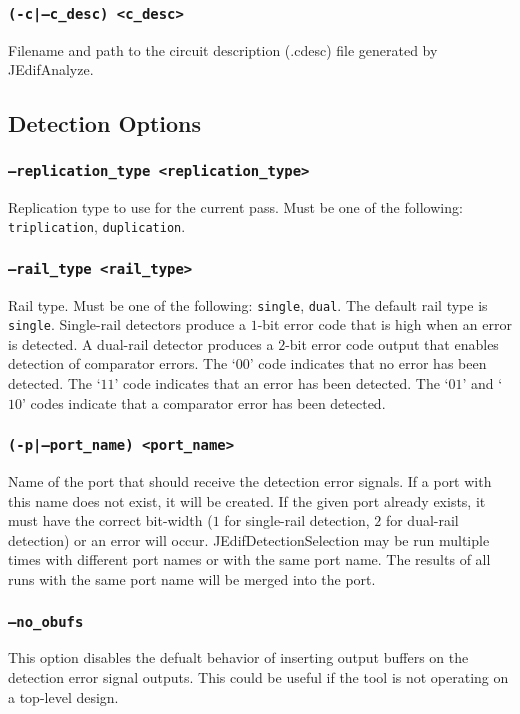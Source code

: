 \subsubsection{\texttt{(-c|--c\_desc) <c\_desc>}}
Filename and path to the circuit description (.cdesc) file generated by
JEdifAnalyze.


\subsection{Detection Options}

\subsubsection{\texttt{--replication\_type <replication\_type>}}
Replication type to use for the current pass. Must be one of the following:
\texttt{triplication}, \texttt{duplication}.

\subsubsection{\texttt{--rail\_type <rail\_type>}}
Rail type. Must be one of the following: \texttt{single}, \texttt{dual}. The
default rail type is \texttt{single}. Single-rail detectors produce a $1$-bit
error code that is high when an error is detected. A dual-rail detector produces
a $2$-bit error code output that enables detection of comparator errors. The
`\texttt{$00$}' code indicates that no error has been detected. The
`\texttt{$11$}' code indicates that an error has been detected. The
`\texttt{$01$}' and `\texttt{$10$}' codes indicate that a comparator error has
been detected.

\subsubsection{\texttt{(-p|--port\_name) <port\_name>}}
Name of the port that should receive the detection error signals. If a port
with this name does not exist, it will be created. If the given port already
exists, it must have the correct bit-width ($1$ for single-rail detection, $2$
for dual-rail detection) or an error will occur. JEdifDetectionSelection may be
run multiple times with different port names or with the same port name. The
results of all runs with the same port name will be merged into the port.

\subsubsection{\texttt{--no\_obufs}}
This option disables the defualt behavior of inserting output buffers on the
detection error signal outputs. This could be useful if the tool is not
operating on a top-level design.

